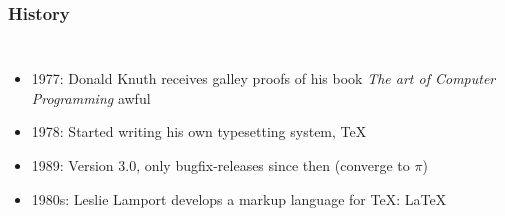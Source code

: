 \documentclass{beamer}
\begin{document}
\begin{frame}
  \frametitle{History}

  \begin{columns}[c]

    \begin{itemize}
    \item<+-> 1977: Donald Knuth receives galley proofs of his book \emph{The art of Computer Programming} awful
    \item<+-> 1978: Started writing his own typesetting system, {\TeX}
    \item<+-> 1989: Version 3.0, only bugfix-releases since then (converge to $\pi$)
    \item<+-> 1980s: Leslie Lamport develops a markup language for {\TeX}: {\LaTeX}
    \end{itemize}


\end{columns}
\end{frame}
\end{document}
